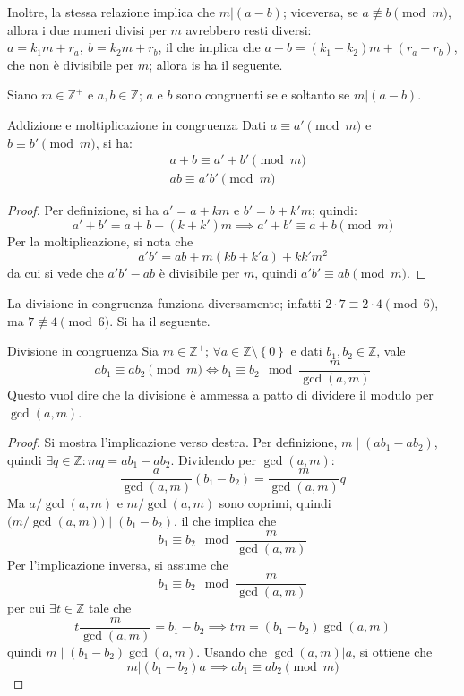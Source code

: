 \documentclass[11pt, a4paper]{scrartcl}
\theoremstyle{definition}
\numberwithin{esempio}{section}
\theoremstyle{definition}
\numberwithin{obs}{section}
\numberwithin{nota}{section}
\numberwithin{equation}{subsection}
\begin{document}
Inoltre, la stessa relazione implica che $m | (a-b)$; viceversa, se $a \not \equiv b \pmod{m} $, allora i due numeri divisi per $m$ avrebbero resti diversi: $a = k_1 m + r_a, \ b = k_2 m + r_b$, il che implica che $a-b = (k_1 - k_2)m + (r_a- r_b)$, che non \`e divisibile per $m$; allora is ha il seguente.
\begin{prop}
	{}{}
	Siano $m \in \mathbb{Z}^+$ e $a,b \in \mathbb{Z}$; $a$ e $b$ sono congruenti se e soltanto se $m | (a-b)$.
\end{prop}
\begin{prop}
	{Addizione e moltiplicazione in congruenza}{}
	Dati $a\equiv a' \pmod{m} $ e $b\equiv b' \pmod{m} $, si ha:
	\[
		\begin{split}
			&a + b \equiv a' + b' \pmod{m}  \\
			& a b\equiv a'b' \pmod{m} 
		\end{split}
	\] 
\begin{proof}
	Per definizione, si ha $a ' = a + km$ e $b' = b + k'm $; quindi:
	\[
	a' + b ' = a+ b + (k+k') m\implies a' + b' \equiv a + b\pmod{m} 
	\] 
	Per la moltiplicazione, si nota che 
	\[
	a' b ' = a b + m(kb + k'a) +kk'm^2
	\] 
	da cui si vede che $a'b' - ab$ \`e divisibile per $m$, quindi $a'b' \equiv ab \pmod{m} $.
\end{proof}	
\end{prop}
La divisione in congruenza funziona diversamente; infatti $2 \cdot  7 \equiv 2 \cdot  4 \pmod{6} $, ma $7 \not \equiv 4 \pmod{6} $. 
Si ha il seguente.
\begin{teorema}
	{Divisione in congruenza}{}
	Sia $m \in \mathbb{Z}^+$; $\forall a \in  \mathbb{Z} \setminus \left\{ 0 \right\} $ e dati $b_1,b_2 \in \mathbb{Z}$, vale
	\[
	ab_1 \equiv ab_2 \pmod{m} \iff b_1 \equiv b_2 \mod{\frac{m}{\operatorname{gcd}(a,m) }} 
	\] 
	Questo vuol dire che la divisione \`e ammessa a patto di dividere il modulo per $\operatorname{gcd}(a,m) $.
	\begin{proof}
		Si mostra l'implicazione verso destra.
		Per definizione, $m  \mid  (ab_1- ab_2)$, quindi $\exists q \in \mathbb{Z} : mq = ab_1 - ab_2$.
		Dividendo per $\operatorname{gcd}(a,m) $:
		\[
		\frac{a}{\operatorname{gcd}(a,m) } (b_1-b_2) = \frac{m}{\operatorname{gcd}(a,m) } q
		\] 
		Ma $a / \operatorname{gcd}(a,m) $ e $m / \operatorname{gcd}(a,m) $ sono coprimi, quindi $\big(m / \operatorname{gcd}(a,m) \big)  \mid (b_1-b_2)$, il che implica che
		\[
		b_1\equiv b_2 \mod \frac{m}{\operatorname{gcd}(a,m) }
		\] 
		Per l'implicazione inversa, si assume che
		\[
		b_1\equiv b_2 \mod \frac{m}{\operatorname{gcd}(a,m) }
		\] 
		per cui $\exists t \in \mathbb{Z}$ tale che 
		\[
		t \frac{m}{\operatorname{gcd}(a,m) } = b_1-b_2 \implies tm  = (b_1-b_2) \operatorname{gcd}(a,m) 
		\] 
		quindi $m  \mid (b_1 -b_2) \operatorname{gcd}(a,m) $. 
		Usando che $\operatorname{gcd}(a,m) | a$, si ottiene che
		\[
		m | (b_1-b_2) a \implies ab_1 \equiv ab_2 \pmod{m} 
		\] 
	\end{proof}
\end{teorema}
\end{document}
